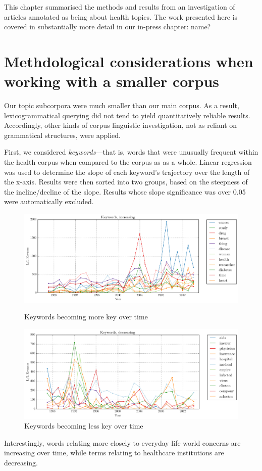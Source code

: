 This chapter summarised the methods and results from an investigation of articles annotated as being about health topics. The work presented here is covered  in substantially more detail in our in-press chapter:  name?

\section{Methdological considerations when working with a smaller corpus}

Our topic subcorpora were much smaller than our main corpus. As a result, lexicogrammatical querying did not tend to yield quantitatively reliable results. Accordingly, other kinds of corpus linguistic investigation, not as reliant on grammatical structures, were applied. 

First, we considered \emph{keywords}---that is, words that were unusually frequent within the health corpus when compared to the corpus as as a whole. Linear regression was used to determine the slope of each keyword's trajectory over the length of the x-axis. Results were then sorted into two groups, based on the steepness of the incline\slash decline of the slope. Results whose slope significance was over 0.05 were automatically excluded.

\begin{figure}[htb!]
\centering
\begin{minipage}{.48\textwidth}
\centering
\includegraphics[width=.95\textwidth]{../images/keywords-increasing.png}
\caption{Keywords becoming more key over time}
\label{fig:key-inc}
\end{minipage}%
\begin{minipage}{.48\textwidth}
\centering
\includegraphics[width=.95\textwidth]{../images/keywords-decreasing.png}
\caption{Keywords becoming less key over time}
\label{fig:key-dec}
\end{minipage}
\end{figure}
%
Interestingly, words relating more closely to everyday life world concerns are increasing over time, while terms relating to healthcare institutions are decreasing.

